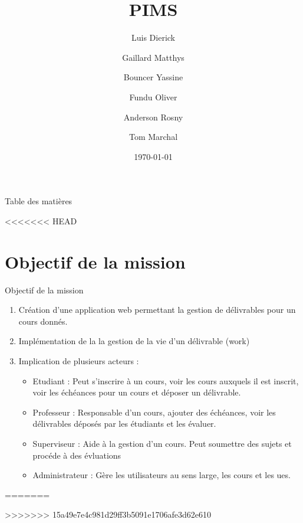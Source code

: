 \documentclass[numbering=fraction,10pt]{beamer}
\title{PIMS}
\author[PIMS]{Luis Dierick \and Gaillard Matthys \and Bouncer Yassine \and Fundu Oliver \and Anderson Rosny \and Tom Marchal }
\institute{Université de Namur}
\date{\today}
\begin{document}
\begin{frame}[plain]{}
    \maketitle
\end{frame}

\begin{frame}{Table des matières}
    \tableofcontents[]
\end{frame}
<<<<<<< HEAD
\section{Objectif de la mission}
\begin{frame}{Objectif de la mission}
    \begin{enumerate}
        \item Création d'une application web permettant la gestion de délivrables pour un cours donnés.
        \item Implémentation de la la gestion de la vie d'un délivrable (work)
        \item Implication de plusieurs acteurs : 
        \begin{itemize}
            \item Etudiant : Peut s'inscrire à un cours, voir les cours auxquels il est inscrit, voir les échéances pour un cours et déposer un délivrable.
            \item Professeur : Responsable d'un cours, ajouter des échéances, voir les délivrables déposés par les étudiants et les évaluer.
            \item Superviseur : Aide à la gestion d'un cours. Peut soumettre des sujets et procéde à des évluations
            \item Administrateur : Gère les utilisateurs au sens large, les cours et les ues.
        \end{itemize}
    \end{enumerate}
\end{frame}
=======

>>>>>>> 15a49e7e4c981d29ff3b5091e1706afe3d62e610
\end{document}
